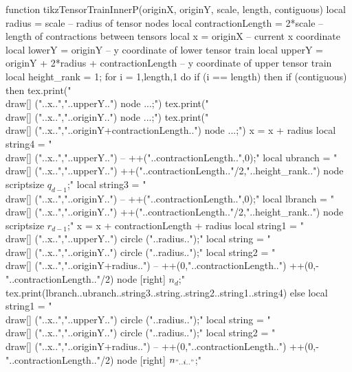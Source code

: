 \begin{luacode*}
function tikzTensorTrainInnerP(originX, originY, scale, length, contiguous)
	 local radius = scale              -- radius of tensor nodes
	 local contractionLength = 2*scale -- length of contractions between tensors
	 local x = originX                                     -- current x coordinate
	 local lowerY = originY																 -- y coordinate of lower tensor train
	 local upperY = originY + 2*radius + contractionLength -- y coordinate of upper tensor train
	 local height_rank = 1;
	 for i = 1,length,1 do
			if (i == length) then
				 if (contiguous) then
						tex.print("\\draw[] ("..x..","..upperY..") node {...};")
						tex.print("\\draw[] ("..x..","..originY..") node {...};")
						tex.print("\\draw[] ("..x..","..originY+contractionLength..") node {...};")
						x = x + radius
						local string4 = "\\draw[] ("..x..","..upperY..") -- ++("..contractionLength..",0);"
						local ubranch = "\\draw[] ("..x..","..upperY..") ++("..contractionLength.."/2,"..height_rank..") node {\\scriptsize $q_{d-1}$};"
						local string3 = "\\draw[] ("..x..","..originY..") -- ++("..contractionLength..",0);"
						local lbranch = "\\draw[] ("..x..","..originY..") ++("..contractionLength.."/2,"..height_rank..") node {\\scriptsize $r_{d-1}$};"
						x = x + contractionLength + radius
						local string1 = "\\draw[] ("..x..","..upperY..") circle ("..radius..");"
						local string = "\\draw[] ("..x..","..originY..") circle ("..radius..");"
						local string2 = "\\draw[] ("..x..","..originY+radius..") -- ++(0,"..contractionLength..") ++(0,-"..contractionLength.."/2) node [right] {$n_{d}$};"
						tex.print(lbranch..ubranch..string3..string..string2..string1..string4)
				 else
						local string1 = "\\draw[] ("..x..","..upperY..") circle ("..radius..");"
						local string = "\\draw[] ("..x..","..originY..") circle ("..radius..");"
						local string2 = "\\draw[] ("..x..","..originY+radius..") -- ++(0,"..contractionLength..") ++(0,-"..contractionLength.."/2) node [right] {$n_{"..i.."}$};"

\end{luacode*}
